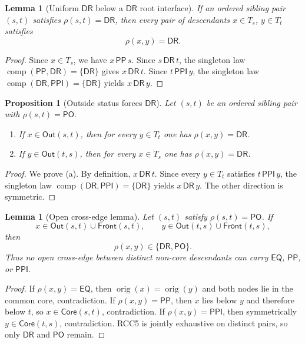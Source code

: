 \documentclass[11pt]{article}
\newtheorem{proposition}[definition]{Proposition}
\newtheorem{lemma}[definition]{Lemma}
\theoremstyle{remark}
\newcommand{\DR}{\mathsf{DR}}
\newcommand{\PO}{\mathsf{PO}}
\newcommand{\PP}{\mathsf{PP}}
\newcommand{\PPI}{\mathsf{PPI}}
\newcommand{\EQ}{\mathsf{EQ}}
\newcommand{\comp}{\operatorname{comp}}
\newcommand{\orig}{\operatorname{orig}}
\newcommand{\Core}{\mathsf{Core}}
\newcommand{\Out}{\mathsf{Out}}
\newcommand{\Front}{\mathsf{Front}}
\begin{document}
\begin{lemma}[Uniform $\DR$ below a $\DR$ root interface]\label{lem:uniform-dr}
If an ordered sibling pair $(s,t)$ satisfies $\rho(s,t)=\DR$, then every pair of descendants $x\in T_s$, $y\in T_t$ satisfies
\[
\rho(x,y)=\DR.
\]
\end{lemma}

\begin{proof}
Since $x\in T_s$, we have $x\,\PP\,s$. Since $s\,\DR\,t$, the singleton law $\comp(\PP,\DR)=\{\DR\}$ gives $x\,\DR\,t$. Since $t\,\PPI\,y$, the singleton law $\comp(\DR,\PPI)=\{\DR\}$ yields $x\,\DR\,y$.
\end{proof}

\begin{proposition}[Outside status forces $\DR$]\label{prop:out-dr}
Let $(s,t)$ be an ordered sibling pair with $\rho(s,t)=\PO$.
\begin{enumerate}[label=(\alph*)]
    \item If $x\in \Out(s,t)$, then for every $y\in T_t$ one has $\rho(x,y)=\DR$.
    \item If $y\in \Out(t,s)$, then for every $x\in T_s$ one has $\rho(x,y)=\DR$.
\end{enumerate}
\end{proposition}

\begin{proof}
We prove (a). By definition, $x\,\DR\,t$. Since every $y\in T_t$ satisfies $t\,\PPI\,y$, the singleton law $\comp(\DR,\PPI)=\{\DR\}$ yields $x\,\DR\,y$. The other direction is symmetric.
\end{proof}

\begin{lemma}[Open cross-edge lemma]\label{lem:open-cross-completed}
Let $(s,t)$ satisfy $\rho(s,t)=\PO$. If
\[
 x\in \Out(s,t)\cup\Front(s,t),\qquad y\in \Out(t,s)\cup\Front(t,s),
\]
then
\[
\rho(x,y)\in\{\DR,\PO\}.
\]
Thus no open cross-edge between distinct non-core descendants can carry $\EQ$, $\PP$, or $\PPI$.
\end{lemma}

\begin{proof}
If $\rho(x,y)=\EQ$, then $\orig(x)=\orig(y)$ and both nodes lie in the common core, contradiction. If $\rho(x,y)=\PP$, then $x$ lies below $y$ and therefore below $t$, so $x\in\Core(s,t)$, contradiction. If $\rho(x,y)=\PPI$, then symmetrically $y\in\Core(t,s)$, contradiction. RCC5 is jointly exhaustive on distinct pairs, so only $\DR$ and $\PO$ remain.
\end{proof}
\end{document}
